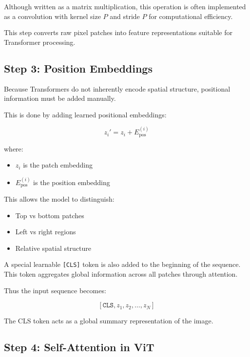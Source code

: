 \documentclass[11pt]{article}
\begin{document}
Although written as a matrix multiplication, this operation is often implemented as a convolution with kernel size $P$ and stride $P$ for computational efficiency.

This step converts raw pixel patches into feature representations suitable for Transformer processing.

\subsection{Step 3: Position Embeddings}

Because Transformers do not inherently encode spatial structure, positional information must be added manually.

This is done by adding learned positional embeddings:

\[
z_i' = z_i + E_{\text{pos}}^{(i)}
\]

where:

\begin{itemize}[nosep]

\item $z_i$ is the patch embedding
\item $E_{\text{pos}}^{(i)}$ is the position embedding

\end{itemize}

This allows the model to distinguish:

\begin{itemize}

\item Top vs bottom patches
\item Left vs right regions
\item Relative spatial structure

\end{itemize}

A special learnable \texttt{[CLS]} token is also added to the beginning of the sequence. This token aggregates global information across all patches through attention.

Thus the input sequence becomes:

\[
[\texttt{CLS}, z_1, z_2, \ldots, z_N]
\]

The CLS token acts as a global summary representation of the image.

\subsection{Step 4: Self-Attention in ViT}
\end{document}
